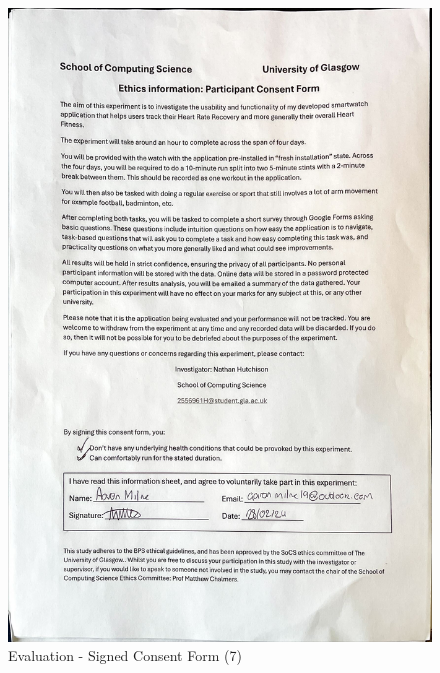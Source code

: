 \documentclass{l4proj}
\begin{document}
\begin{figure}[h!]
    \centering
    \includegraphics[width=1\linewidth]{dissertation//dissImages/Consent7.jpg}
    \caption{Evaluation - Signed Consent Form (7)}
\end{figure}






\renewcommand{\thechapter}{0}

\end{document}
